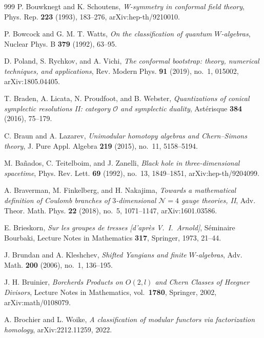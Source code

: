 \begin{thebibliography}{999}
P. Bouwknegt and K. Schoutens, \emph{W-symmetry in conformal field theory}, Phys. Rep. \textbf{223} (1993), 183--276, arXiv:hep-th/9210010.

P. Bowcock and G. M. T. Watts, \emph{On the classification of quantum $W$-algebras}, Nuclear Phys. B \textbf{379} (1992), 63--95.

D. Poland, S. Rychkov, and A. Vichi, \emph{The conformal bootstrap: theory, numerical techniques, and applications}, Rev. Modern Phys. \textbf{91} (2019), no.~1, 015002, arXiv:1805.04405.

T. Braden, A. Licata, N. Proudfoot, and B. Webster, \emph{Quantizations of conical symplectic resolutions II: category $\mathcal{O}$ and symplectic duality}, Ast\'erisque \textbf{384} (2016), 75--179.

C. Braun and A. Lazarev, \emph{Unimodular homotopy algebras and Chern--Simons theory}, J. Pure Appl. Algebra \textbf{219} (2015), no.~11, 5158--5194.

M. Ba\~nados, C. Teitelboim, and J. Zanelli, \emph{Black hole in three-dimensional spacetime}, Phys. Rev. Lett. \textbf{69} (1992), no.~13, 1849--1851, arXiv:hep-th/9204099.

A. Braverman, M. Finkelberg, and H. Nakajima, \emph{Towards a mathematical definition of Coulomb branches of $3$-dimensional $\mathcal{N}=4$ gauge theories, II}, Adv. Theor. Math. Phys. \textbf{22} (2018), no.~5, 1071--1147, arXiv:1601.03586.

E. Brieskorn, \emph{Sur les groupes de tresses [d'apr\`es V.~I.~Arnold]}, S\'eminaire Bourbaki, Lecture Notes in Mathematics \textbf{317}, Springer, 1973, 21--44.

J. Brundan and A. Kleshchev, \emph{Shifted Yangians and finite $W$-algebras}, Adv. Math. \textbf{200} (2006), no.~1, 136--195.

J. H. Bruinier, \emph{Borcherds Products on $O(2,l)$ and Chern Classes of Heegner Divisors}, Lecture Notes in Mathematics, vol.~\textbf{1780}, Springer, 2002, arXiv:math/0108079.

A. Brochier and L. Woike, \emph{A classification of modular functors via factorization homology}, arXiv:2212.11259, 2022.


\end{thebibliography}
